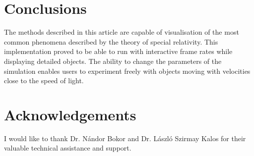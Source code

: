 \documentclass{egpubl}
\begin{document}
\section{Conclusions}
\label{sec:concl}
The methods described in this article are capable of visualisation of the most common phenomena described by the theory of special relativity. This implementation proved to be able to run with interactive frame rates while displaying detailed objects. The ability to change the parameters of the simulation enables users to experiment freely with objects moving with velocities close to the speed of light. 

\section*{Acknowledgements}
I would like to thank Dr. Nándor Bokor and Dr. László Szirmay Kalos for their valuable technical assistance and support.
\end{document}
